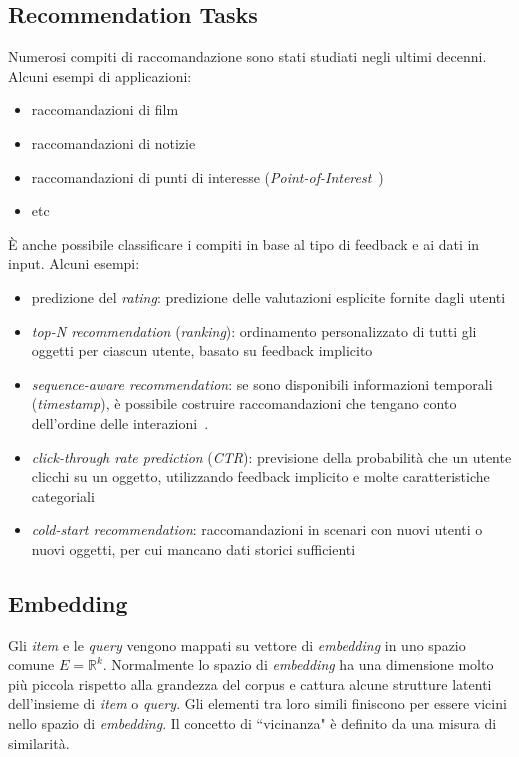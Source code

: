\subsection{Recommendation Tasks}

Numerosi compiti di raccomandazione sono stati studiati negli ultimi decenni. Alcuni esempi di applicazioni:

\begin{itemize}
    \item raccomandazioni di film
    \item raccomandazioni di notizie
    \item raccomandazioni di punti di interesse (\textit{Point-of-Interest}~\cite{Ye})
    \item etc
\end{itemize}

È anche possibile classificare i compiti in base al tipo di feedback e ai dati in input. Alcuni esempi:

\begin{itemize}
    \item predizione del \textit{rating}: predizione delle valutazioni esplicite fornite dagli utenti    
    \item \textit{top-N recommendation} (\textit{ranking}): ordinamento personalizzato di tutti gli oggetti per ciascun utente, basato su feedback implicito    
    \item \textit{sequence-aware recommendation}: se sono disponibili informazioni temporali (\textit{timestamp}), è possibile costruire raccomandazioni che tengano conto dell’ordine delle interazioni~\cite{Quadrana}.
    \item \textit{click-through rate prediction} (\textit{CTR}): previsione della probabilità che un utente clicchi su un oggetto, utilizzando feedback implicito e molte caratteristiche categoriali
    \item \textit{cold-start recommendation}: raccomandazioni in scenari con nuovi utenti o nuovi oggetti, per cui mancano dati storici sufficienti~\cite{Schein}
\end{itemize}

\subsection{Embedding}
Gli \textit{item} e le \textit{query} vengono mappati su  vettore di \textit{embedding} in uno spazio comune $E = \mathbb{R}^k$. Normalmente lo spazio di \textit{embedding} ha una dimensione molto più piccola rispetto alla grandezza del corpus e cattura alcune strutture latenti dell'insieme di \textit{item} o \textit{query}. Gli elementi tra loro simili finiscono per essere vicini nello spazio di \textit{embedding}. Il concetto di ``vicinanza" è definito da una misura di similarità.
 
